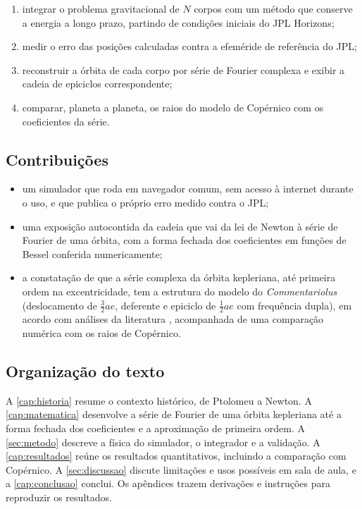 \begin{enumerate}
  \item integrar o problema gravitacional de $N$ corpos com um método que conserve a energia a longo prazo, partindo de condições iniciais do JPL Horizons;
  \item medir o erro das posições calculadas contra a efeméride de referência do JPL;
  \item reconstruir a órbita de cada corpo por série de Fourier complexa e exibir a cadeia de epiciclos correspondente;
  \item comparar, planeta a planeta, os raios do modelo de Copérnico com os coeficientes da série.
\end{enumerate}

\subsection{Contribuições}

\begin{itemize}
  \item um simulador que roda em navegador comum, sem acesso à internet durante o uso, e que publica o próprio erro medido contra o JPL;
  \item uma exposição autocontida da cadeia que vai da lei de Newton à série de Fourier de uma órbita, com a forma fechada dos coeficientes em funções de Bessel conferida numericamente;
  \item a constatação de que a série complexa da órbita kepleriana, até primeira ordem na excentricidade, tem a estrutura do modelo do \emph{Commentariolus} (deslocamento de $\tfrac{3}{2}ae$, deferente e epiciclo de $\tfrac{1}{2}ae$ com frequência dupla), em acordo com análises da literatura \cite{gallavotti2001,sugon2008}, acompanhada de uma comparação numérica com os raios de Copérnico.
\end{itemize}

\subsection{Organização do texto}

A \autoref{cap:historia} resume o contexto histórico, de Ptolomeu a Newton. A \autoref{cap:matematica} desenvolve a série de Fourier de uma órbita kepleriana até a forma fechada dos coeficientes e a aproximação de primeira ordem. A \autoref{sec:metodo} descreve a física do simulador, o integrador e a validação. A \autoref{cap:resultados} reúne os resultados quantitativos, incluindo a comparação com Copérnico. A \autoref{sec:discussao} discute limitações e usos possíveis em sala de aula, e a \autoref{cap:conclusao} conclui. Os apêndices trazem derivações e instruções para reproduzir os resultados.

